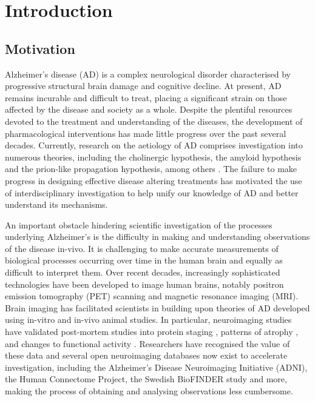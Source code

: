 \chapter{Introduction}
\label{chp:1}
\section{Motivation}
\label{sec:1-motivation}
Alzheimer's disease (AD) is a complex neurological disorder
characterised by progressive structural brain damage and cognitive decline.
At present, AD remains incurable and difficult to treat,
placing a significant strain on those affected by the disease and society as a
whole. Despite the plentiful resources devoted to the treatment and
understanding of the diseases, the development of pharmacological interventions
has made little progress over the past several decades. Currently, research on
the aetiology of AD comprises investigation into numerous theories, including
the cholinergic hypothesis, the amyloid hypothesis and the prion-like
propagation hypothesis, among others \cite{liu2019history}. The failure to make
progress in designing effective disease altering treatments has motivated the
use of interdisciplinary investigation to help unify our knowledge of AD and
better understand its mechanisms. 

An important obstacle hindering scientific investigation of the processes
underlying Alzheimer's is the difficulty in making and understanding
observations of the disease in-vivo. It is challenging to make accurate
measurements of biological processes occurring over time in the human brain and
equally as difficult to interpret them. Over recent decades, increasingly
sophisticated technologies have been developed to image human brains, notably
positron emission tomography (PET) scanning and magnetic resonance imaging
(MRI). Brain imaging has facilitated scientists in building upon theories of AD
developed using in-vitro and in-vivo animal studies.  
In particular, neuroimaging studies have validated post-mortem studies into
protein staging \cite{Ossenkoppele2016,SCHOLL2016971,lowe2016, cho2016vivo},
patterns of atrophy \cite{jack2018nia,whitewell2010}, and changes to functional
activity \cite{chen2019functional}. Researchers have recognised the value of
these data and several open neuroimaging databases now exist to accelerate
investigation, including the Alzheimer's Disease Neuroimaging Initiative (ADNI),
the Human Connectome Project, the Swedish BioFINDER study and more, making
the process of obtaining and analysing observations less cumbersome. 

